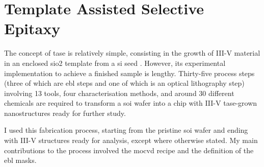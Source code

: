 \section{Template Assisted Selective Epitaxy}
\label{chap:tase}

The concept of \acs{tase} is relatively simple, consisting in the growth of III-V material in an enclosed \acs{sio2} template from a \acs{si} seed \cite{Schmid2015, borgTASEp2018}. However, its experimental implementation to achieve a finished sample is lengthy. Thirty-five process steps (three of which are \acf{ebl} steps and one of which is an optical lithography step) involving 13 tools, four characterisation methods, and around 30 different chemicals are required to transform a \acf{soi} wafer into a chip with III-V \acs{tase}-grown nanostructures ready for further study. 

I used this fabrication process, starting from the pristine \acs{soi} wafer and ending with III-V structures ready for analysis, except where otherwise stated. My main contributions to the process involved the \acs{mocvd} recipe and the definition of the \acs{ebl} masks.


